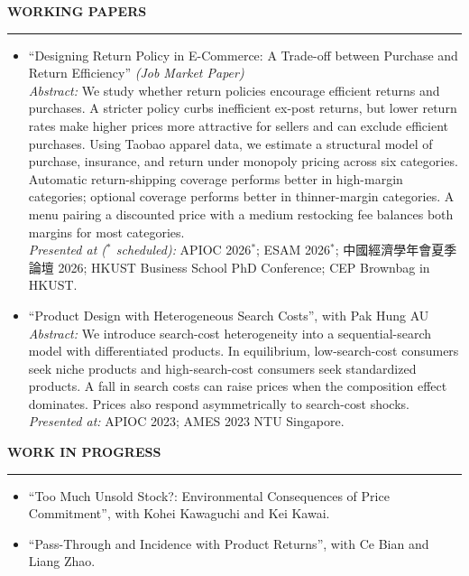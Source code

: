 \documentclass[11pt,letterpaper]{article}
\newcommand{\sectionheader}[1]{%
  \vspace{0.45em}
  {\large\bfseries #1}\\[-0.15em]
  \rule{\textwidth}{0.4pt}\par
  \vspace{0.2em}
}
\begin{document}
\vspace{-0.45em}
\sectionheader{WORKING PAPERS}
\begin{itemize}
  \item ``Designing Return Policy in E-Commerce: A Trade-off between Purchase and Return Efficiency'' \textit{(Job Market Paper)}\\[0.15em]
  \textit{Abstract:} We study whether return policies encourage efficient returns and purchases. A stricter policy curbs inefficient ex-post returns, but lower return rates make higher prices more attractive for sellers and can exclude efficient purchases. Using Taobao apparel data, we estimate a structural model of purchase, insurance, and return under monopoly pricing across six categories. Automatic return-shipping coverage performs better in high-margin categories; optional coverage performs better in thinner-margin categories. A menu pairing a discounted price with a medium restocking fee balances both margins for most categories.\\[0.12em]
  \textit{Presented at ($^{\ast}$ scheduled):} APIOC 2026$^{\ast}$; ESAM 2026$^{\ast}$; 中國經濟學年會夏季論壇 2026; HKUST Business School PhD Conference; CEP Brownbag in HKUST.

  \item ``Product Design with Heterogeneous Search Costs'', with Pak Hung AU\\[0.15em]
  \textit{Abstract:} We introduce search-cost heterogeneity into a sequential-search model with differentiated products. In equilibrium, low-search-cost consumers seek niche products and high-search-cost consumers seek standardized products. A fall in search costs can raise prices when the composition effect dominates. Prices also respond asymmetrically to search-cost shocks.\\[0.12em]
  \textit{Presented at:} APIOC 2023; AMES 2023 NTU Singapore.
\end{itemize}

\sectionheader{WORK IN PROGRESS}
\begin{itemize}
  \item ``Too Much Unsold Stock?: Environmental Consequences of Price Commitment'', with Kohei Kawaguchi and Kei Kawai.
  \item ``Pass-Through and Incidence with Product Returns'', with Ce Bian and Liang Zhao.
\end{itemize}
\end{document}
